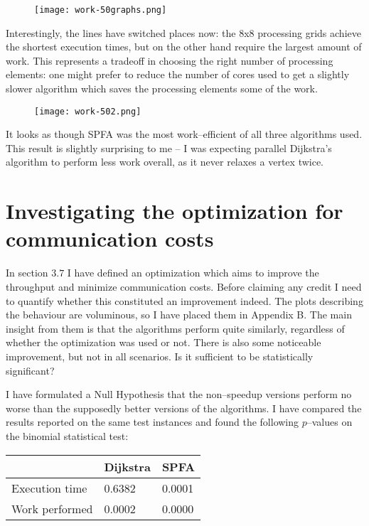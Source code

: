 \documentclass[12pt,a4paper,oneside,openright]{report}
\begin{document}
\begin{figure}[h]
\texttt{[image: work-50graphs.png]}
\end{figure}

Interestingly, the lines have switched places now: the $8$x$8$ processing grids achieve the shortest execution times, but on the other hand require the largest amount of work. This represents a tradeoff in choosing the right number of processing elements: one might prefer to reduce the number of cores used to get a slightly slower algorithm which saves the processing elements some of the work.

\begin{figure}[ht]
\centering
\texttt{[image: work-502.png]}
\end{figure}

It looks as though SPFA was the most work--efficient of all three algorithms used. This result is slightly surprising to me -- I was expecting parallel Dijkstra's algorithm to perform less work overall, as it never relaxes a vertex twice.

\section{Investigating the optimization for communication costs}
In section $3.7$ I have defined an optimization which aims to improve the throughput and minimize communication costs. Before claiming any credit I need to quantify whether this constituted an improvement indeed. The plots describing the behaviour are voluminous, so I have placed them in Appendix B. The main insight from them is that the algorithms perform quite similarly, regardless of whether the optimization was used or not. There is also some noticeable improvement, but not in all scenarios. Is it sufficient to be statistically significant?

I have formulated a Null Hypothesis that the non--speedup versions perform no worse than the supposedly better versions of the algorithms. I have compared the results reported on the same test instances and found the following $p$--values on the binomial statistical test:

\begin{center}
\begin{tabular}{|l|l|l|}
\hline
\centering & Dijkstra & SPFA \\ \hline
\centering Execution time & 0.6382 & 0.0001 \\ \hline
\centering Work performed & 0.0002 & 0.0000 \\ \hline
\end{tabular}
\end{center}
\end{document}
